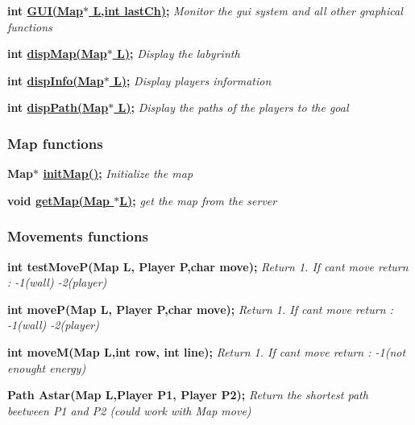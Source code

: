{\bfseries int \hyperlink{guilib_8h_a74faad0e3c55dfd39a5ecd03e9ae60f1}{G\+U\+I(\+Map$\ast$ L,int last\+Ch)};} {\itshape Monitor the gui system and all other graphical functions}

{\bfseries int \hyperlink{guilib_8h_a82e2bf7357d16998055a8768e3632f0e}{disp\+Map(\+Map$\ast$ L)};} {\itshape Display the labyrinth}

{\bfseries int \hyperlink{guilib_8h_abbe720778f4a4bb964fb8dfacaf2e315}{disp\+Info(\+Map$\ast$ L)};} {\itshape Display players\textquotesingle{} information}

{\bfseries int \hyperlink{guilib_8h_a49ec06bbcb4afaba4ec233e5f5d0ea50}{disp\+Path(\+Map$\ast$ L)};} {\itshape Display the paths of the players to the goal}

\subsubsection*{Map functions}

{\bfseries Map$\ast$ \hyperlink{mapping_8c_a1b4990072cb0d42063abd514d5c9726c}{init\+Map()};} {\itshape Initialize the map}

{\bfseries void \hyperlink{mapping_8h_acd86842943223c3da418c5981befabf6}{get\+Map(\+Map $\ast$\+L)};} {\itshape get the map from the server} \subsubsection*{Movements functions}

{\bfseries int test\+Move\+P(\+Map L, Player P,char move);} {\itshape Return 1. If can\textquotesingle{}t move return \+: -\/1(wall) -\/2(player)}

{\bfseries int move\+P(\+Map L, Player P,char move);} {\itshape Return 1. If can\textquotesingle{}t move return \+: -\/1(wall) -\/2(player)}

{\bfseries int move\+M(\+Map L,int row, int line);} {\itshape Return 1. If can\textquotesingle{}t move return \+: -\/1(not enought energy)}

{\bfseries Path Astar(\+Map L,\+Player P1, Player P2);} {\itshape Return the shortest path beetween P1 and P2 (could work with Map move)} 
